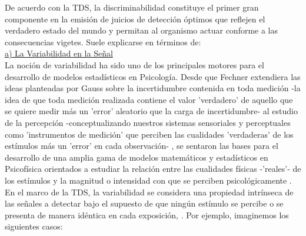 De acuerdo con la TDS, la discriminabilidad constituye el primer gran componente en la emisión de juicios de detección óptimos que reflejen el verdadero estado del mundo y permitan al organismo actuar conforme a las consecuencias vigetes. Suele explicarse en términos de:\\ %

\underline{a) La Variabilidad en la Señal}\\

La noción de variabilidad ha sido uno de los principales motores para el desarrollo de modelos estadísticos en Psicología. Desde que Fechner extendiera las ideas planteadas por Gauss sobre la incertidumbre contenida en toda medición -la idea de que toda medición realizada contiene el valor 'verdadero' de aquello que se quiere medir más un 'error' aleatorio que la carga de incertidumbre- al estudio de la percepción -conceptualizando nuestros sistemas sensoriales y perceptuales como 'instrumentos de medición' que perciben las cualidades 'verdaderas' de los estímulos más un 'error' en cada observación- \parencite{Fechner, Gauss}, se sentaron las bases para el desarrollo de una amplia gama de modelos matemáticos y estadísticos en Psicofísica orientados a estudiar la relación entre las cualidades físicas -'reales'- de los estímulos y la magnitud o intensidad con que se perciben psicológicamente \parencite{Link1994}.\\

En el marco de la TDS, la variabilidad se considera una propiedad intrínseca de las señales a detectar bajo el supuesto de que ningún estímulo se percibe o se presenta de manera idéntica en cada exposición, \parencite{Tanner1954}. Por ejemplo, imaginemos los siguientes casos: \\

